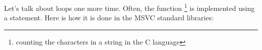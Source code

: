 ﻿Let's talk about loops one more time. Often, the  
function
\footnote{counting the characters in a string in the C language} 
is implemented using a  statement.
Here is how it is done in the MSVC standard libraries:
